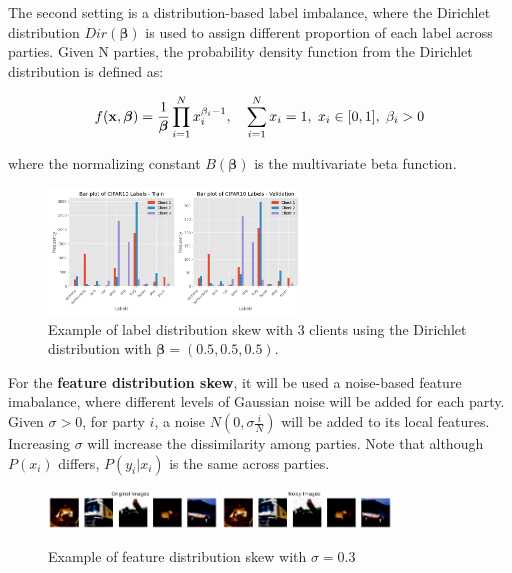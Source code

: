 The second setting is a distribution-based label imbalance, where the Dirichlet distribution $Dir(\boldsymbol{\beta})$  is used to assign different proportion of each label across parties. Given N parties, the probability density function from the Dirichlet distribution is defined as:

\begin{equation*}
  f(\mathbf{x}, \boldsymbol{\beta}) = \frac{1}{\boldsymbol{\beta}} \prod_{i=1}^N x_i^{\beta_i - 1}, \quad \sum_{i=1}^N x_i = 1, \hspace*{.3 em} x_i \in [0,1], \hspace*{.3 em} \beta_i > 0
\end{equation*}

where the normalizing constant $B(\boldsymbol{\beta})$ is the multivariate beta function.

\begin{figure}[H]
  \centering
  \includegraphics[width=0.6\textwidth]{figures/2-Federated_Learning/Example_Dirichlet_beta_0_5_3_clients.png}
  \caption{Example of label distribution skew with 3 clients using the Dirichlet distribution with $\boldsymbol{\beta}=(0.5, 0.5, 0.5)$.}
\end{figure}

For the \textbf{feature distribution skew}, it will be used a noise-based feature imabalance, where different levels of Gaussian noise will be added for each party. Given $\sigma > 0$, for party $i$, a noise $N(0, \sigma \frac{i}{N})$ will be added to its local features. Increasing $\sigma$ will increase the dissimilarity among parties. Note that although $P(x_i)$ differs, $P(y_i | x_i)$ is the same across parties.

\begin{figure}[!ht]
\centering
\includegraphics[width=0.4\textwidth]{figures/2-Federated_Learning/Example_noise_based_feature_imabalance_original.png}
\includegraphics[width=0.4\textwidth]{figures/2-Federated_Learning/Example_noise_based_feature_imabalance_Gaussian_0.3.png}
\caption{Example of feature distribution skew with $\sigma=0.3$}
\end{figure}

